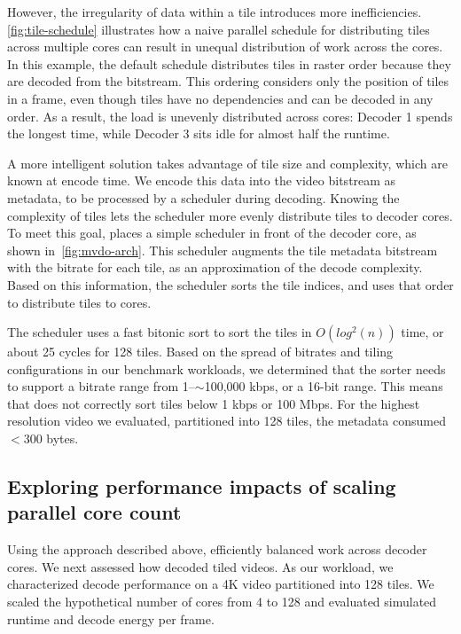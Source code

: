 However, the irregularity of data within a tile introduces more inefficiencies.
\ref{fig:tile-schedule} illustrates how a naive parallel schedule for distributing tiles across multiple cores can result in unequal distribution of work across the cores.
In this example, the default schedule distributes tiles in raster order because they are decoded from the \hevc bitstream.
This ordering considers only the position of tiles in a frame, even though tiles have no dependencies and can be decoded in any order.
As a result, the load is unevenly distributed across cores: Decoder 1 spends the longest time, while Decoder 3 sits idle for almost half the runtime.

A more intelligent solution takes advantage of tile size and complexity, which are known at encode time.
We encode this data into the video bitstream as metadata, to be processed by a scheduler during decoding.
Knowing the complexity of tiles lets the scheduler more evenly distribute tiles to decoder cores.
To meet this goal, \nameArch places a simple scheduler in front of the decoder core, as shown in~\ref{fig:mvdo-arch}.
This scheduler augments the tile metadata bitstream with the bitrate for each tile, as an approximation of the decode complexity.
Based on this information, the scheduler sorts the tile indices, and uses that order to distribute tiles to cores.

\coresVsDecodeSpeedupFigure


The scheduler uses a fast bitonic sort to sort the tiles in $O(log^2(n))$ time, or about 25 cycles for 128 tiles.
Based on the spread of bitrates and tiling configurations in our benchmark workloads, we determined that the sorter needs to support a bitrate range from 1--$\sim$100,000 kbps, or a 16-bit range.
This means that \nameArch does not correctly sort tiles below 1 kbps or 100 Mbps.
For the highest resolution video we evaluated, partitioned into 128 tiles, the metadata consumed $<300$ bytes.

\subsection{Exploring performance impacts of scaling parallel core count}
\label{subsec:parallel-design-space}
Using the approach described above, \nameArch efficiently balanced work across decoder cores.  We next assessed how \nameArch decoded tiled videos.
As our workload, we characterized decode performance on a 4K video partitioned into 128 tiles.
We scaled the hypothetical number of cores from 4 to 128 and evaluated simulated runtime and decode energy per frame.


